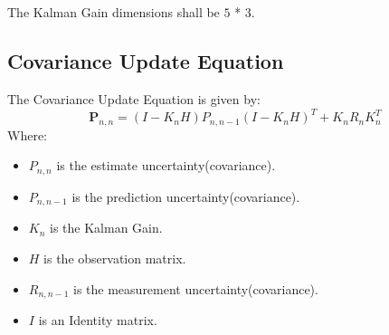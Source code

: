 \documentclass[eng]{ajceam-class}
\newcommand{\vect}[1]{\mathbf{#1}}  %
\begin{document}
\\
\\
The Kalman Gain dimensions shall be $5$ * ${3}$.

\subsection{Covariance Update Equation}
The Covariance Update Equation is given by:\\
\begin{equation} \label{ec-1}
\boldsymbol{P}_{n, n}=\left(I-K_{n} H\right) P_{n, n-1}\left(I-K_{n} H\right)^{T}+K_{n} R_{n} K_{n}^{T}
\end{equation}
Where:
\begin{itemize}
\item ${P}_{n,n}$ is the estimate uncertainty(covariance).
\item ${P}_{n,n-1}$ is the prediction uncertainty(covariance).
\item ${K}_{n}$ is the Kalman Gain.
\item ${H}$ is the observation matrix.
\item ${R}_{n,n-1}$ is the measurement uncertainty(covariance).
\item ${I}$ is an Identity matrix.
\end{itemize}











\end{document}
